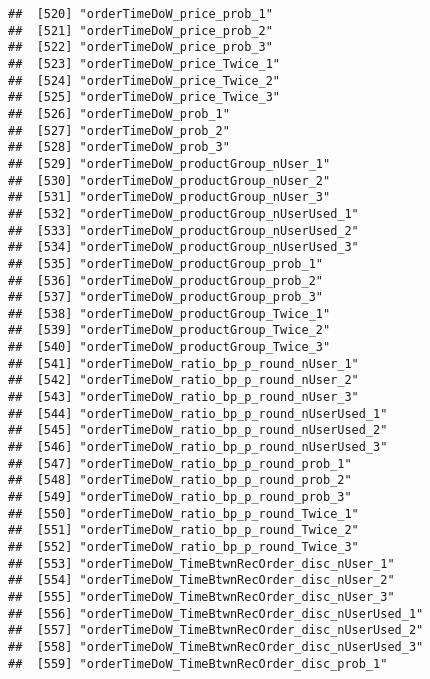 \documentclass[10pt]{report}
\begin{document}
\begin{verbatim}
##  [520] "orderTimeDoW_price_prob_1"                            
##  [521] "orderTimeDoW_price_prob_2"                            
##  [522] "orderTimeDoW_price_prob_3"                            
##  [523] "orderTimeDoW_price_Twice_1"                           
##  [524] "orderTimeDoW_price_Twice_2"                           
##  [525] "orderTimeDoW_price_Twice_3"                           
##  [526] "orderTimeDoW_prob_1"                                  
##  [527] "orderTimeDoW_prob_2"                                  
##  [528] "orderTimeDoW_prob_3"                                  
##  [529] "orderTimeDoW_productGroup_nUser_1"                    
##  [530] "orderTimeDoW_productGroup_nUser_2"                    
##  [531] "orderTimeDoW_productGroup_nUser_3"                    
##  [532] "orderTimeDoW_productGroup_nUserUsed_1"                
##  [533] "orderTimeDoW_productGroup_nUserUsed_2"                
##  [534] "orderTimeDoW_productGroup_nUserUsed_3"                
##  [535] "orderTimeDoW_productGroup_prob_1"                     
##  [536] "orderTimeDoW_productGroup_prob_2"                     
##  [537] "orderTimeDoW_productGroup_prob_3"                     
##  [538] "orderTimeDoW_productGroup_Twice_1"                    
##  [539] "orderTimeDoW_productGroup_Twice_2"                    
##  [540] "orderTimeDoW_productGroup_Twice_3"                    
##  [541] "orderTimeDoW_ratio_bp_p_round_nUser_1"                
##  [542] "orderTimeDoW_ratio_bp_p_round_nUser_2"                
##  [543] "orderTimeDoW_ratio_bp_p_round_nUser_3"                
##  [544] "orderTimeDoW_ratio_bp_p_round_nUserUsed_1"            
##  [545] "orderTimeDoW_ratio_bp_p_round_nUserUsed_2"            
##  [546] "orderTimeDoW_ratio_bp_p_round_nUserUsed_3"            
##  [547] "orderTimeDoW_ratio_bp_p_round_prob_1"                 
##  [548] "orderTimeDoW_ratio_bp_p_round_prob_2"                 
##  [549] "orderTimeDoW_ratio_bp_p_round_prob_3"                 
##  [550] "orderTimeDoW_ratio_bp_p_round_Twice_1"                
##  [551] "orderTimeDoW_ratio_bp_p_round_Twice_2"                
##  [552] "orderTimeDoW_ratio_bp_p_round_Twice_3"                
##  [553] "orderTimeDoW_TimeBtwnRecOrder_disc_nUser_1"           
##  [554] "orderTimeDoW_TimeBtwnRecOrder_disc_nUser_2"           
##  [555] "orderTimeDoW_TimeBtwnRecOrder_disc_nUser_3"           
##  [556] "orderTimeDoW_TimeBtwnRecOrder_disc_nUserUsed_1"       
##  [557] "orderTimeDoW_TimeBtwnRecOrder_disc_nUserUsed_2"       
##  [558] "orderTimeDoW_TimeBtwnRecOrder_disc_nUserUsed_3"       
##  [559] "orderTimeDoW_TimeBtwnRecOrder_disc_prob_1"            

\end{verbatim}
\end{document}
